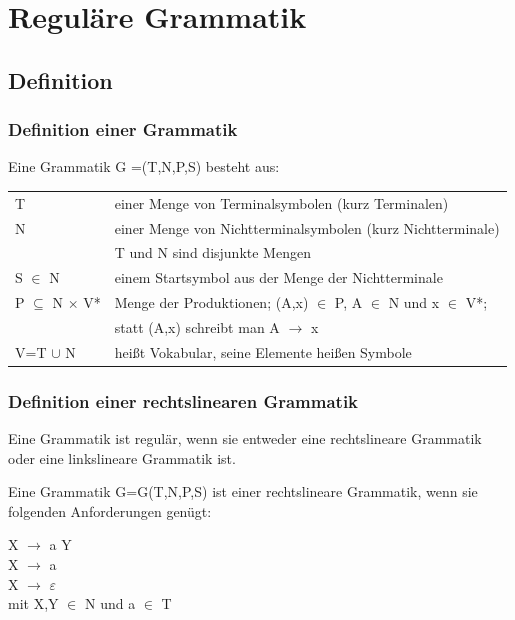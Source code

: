 \chapter{Reguläre Grammatik}

\section{Definition}

\subsection{Definition einer Grammatik}

Eine Grammatik G =(T,N,P,S) besteht aus:

\begin{tabular*}{1.0\textwidth}{l @{\extracolsep{\fill}} l}

T & einer Menge von Terminalsymbolen (kurz Terminalen)\\
N & einer Menge von Nichtterminalsymbolen (kurz Nichtterminale)\\
 & T und N sind disjunkte Mengen\\
 S $\in$ N & einem Startsymbol aus der Menge der Nichtterminale\\
 P $\subseteq$ N $\times$ V* & Menge der Produktionen; (A,x) $\in$ P, A $\in$ N
 und x $\in$ V*; \\
  & statt (A,x) schreibt man A $\rightarrow$ x\\
 V=T $\cup$ N & heißt Vokabular, seine Elemente heißen Symbole\\
 
\end{tabular*}

\subsection{Definition einer rechtslinearen Grammatik}

Eine Grammatik ist regulär, wenn sie entweder eine rechtslineare Grammatik oder
eine linkslineare Grammatik ist.

Eine Grammatik G=G(T,N,P,S) ist einer rechtslineare Grammatik, wenn sie
folgenden Anforderungen genügt:

X $\rightarrow$ a Y \\
X $\rightarrow$ a \\
X $\rightarrow$ $\varepsilon$ \\
mit X,Y $\in$ N und a $\in$ T \\

